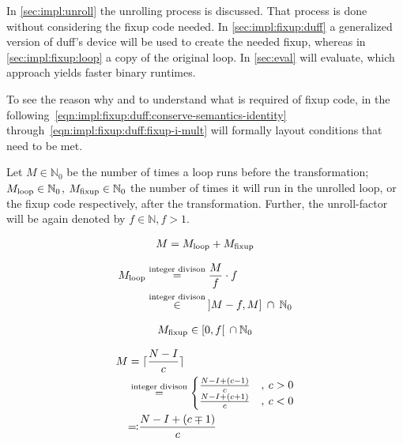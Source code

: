 In \cref{sec:impl:unroll} the unrolling process is discussed.
That process is done without considering the fixup code needed.
In \cref{sec:impl:fixup:duff} a generalized version of duff's device will be used to create the needed fixup, whereas in \cref{sec:impl:fixup:loop} a copy of the original loop.
In \cref{sec:eval} will evaluate, which approach yields faster binary runtimes.

To see the reason why and to understand what is required of fixup code, in the following~\cref{eqn:impl:fixup:duff:conserve-semantics-identity} through~\cref{eqn:impl:fixup:duff:fixup-i-mult} will formally layout conditions that need to be met.

Let $M \in \mathbb{N}_0$ be the number of times a loop runs before the transformation; $M_{\text{loop}} \in \mathbb{N}_0$, $M_{\text{fixup}} \in \mathbb{N}_0$ the number of times it will run in the unrolled loop, or the fixup code respectively, after the transformation.
Further, the unroll-factor will be again denoted by $f \in \mathbb{N}, f > 1$.

\begin{equation}\label{eqn:impl:fixup:duff:conserve-semantics-identity}
\begin{aligned}
    M = M_{\text{loop}} + M_{\text{fixup}}
\end{aligned}
\end{equation}

\begin{equation}\label{eqn:impl:fixup:duff:loop-iterations}
\begin{aligned}
    M_{\text{loop}} &\overset{\text{integer divison}}{=} \frac{M}{f} \cdot f\\
    &\overset{\text{integer divison}}{\in} \medspace \rbrack M-f,M \rbrack \medspace \cap \medspace \mathbb{N}_0
\end{aligned}
\end{equation}

\begin{equation}\label{eqn:impl:fixup:duff:fixup-interval}
\begin{aligned}
    M_{\text{fixup}} \in \lbrack0, f\lbrack \medspace \medspace \cap \medspace \mathbb{N}_0
\end{aligned}
\end{equation}

\begin{equation}\label{eqn:impl:fixup:duff:total-iteration-based-on-bounds}
\begin{aligned}
    M &= \ceil{\frac{N - I}{c}} \\
    & \overset{\text{integer divison}}{=}
    \begin{cases}
        \frac{N - I + (c - 1)}{c} &, \medspace c > 0\\
        \frac{N - I + (c + 1)}{c} &, \medspace c < 0
    \end{cases}\\
    &\text{\reflectbox{$\coloneqq$}} \frac{N - I + (c \mp 1)}{c}
\end{aligned}
\end{equation}

